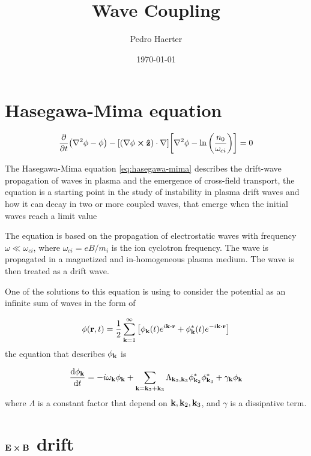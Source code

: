 \documentclass[12pt, a4paper]{article}
\author{Pedro Haerter}
\title{Wave Coupling}
\date{\today}
\begin{document}
\maketitle
\onehalfspacing 

\section{Hasegawa-Mima equation}

\begin{equation}
	\pdv{t}(\nabla^2\phi-\phi)-\qty[(\nabla\phi\cp\vb{\hat{z}})\cdot\nabla]\qty[\nabla^2\phi-\ln\qty(\frac{n_0}{\omega_{ci}})]=0
	\label{eq:hasegawa-mima}
\end{equation}

The Hasegawa-Mima equation \ref{eq:hasegawa-mima}  describes the drift-wave propagation of waves in plasma and the emergence of cross-field transport, the equation is a starting point in the study of instability in plasma drift waves and how it can decay in two or more coupled waves, that emerge when the initial waves reach a limit value

The equation is based on the propagation of electrostatic waves with frequency $\omega\ll\omega_{ci}$, where $\omega_{ci}=eB/m_i$ is the ion cyclotron frequency. The wave is propagated in a magnetized and in-homogeneous plasma medium.  The wave is then treated as a drift wave.

One of the solutions to this equation is using to consider the potential as an infinite sum of waves in the form of 

\begin{equation}
	\phi(\vb{r},t)=\frac{1}{2} \sum_{\vb{k}=1}^{\infty}\qty[\phi_{\vb{k}}(t)e^{i\vb{k}\vdot\vb{r}}+\phi^*_{\vb{k}}(t)e^{-i\vb{k}\vdot\vb{r}}]
\end{equation}
the equation that describes $\phi_{\vb{k}}$ is 

\begin{equation}
	\dv{\phi_{\vb{k}}}{t}=-i\omega_{\vb{k}}\phi_{\vb{k}}+\sum_{\vb{k}=\vb{k}_2+\vb{k}_3}\Lambda_{\vb{k}_2,\vb{k}_3} \phi_{\vb{k}_2}^*\phi_{\vb{k}_3}^* +\gamma_{\vb{k}}\phi_{\vb{k}}
	\label{eq:sol_hwm}
\end{equation}
where $\Lambda$ is a constant factor that depend on $\vb{k},\vb{k}_2,\vb{k}_3$, and $\gamma$ is a dissipative term.

\section{$\vb{E}\cp\vb{B}$ drift}
\end{document}

